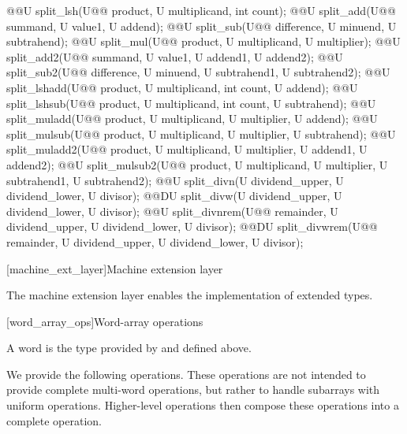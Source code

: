 \begin{addedblock}
\begin{itemdecl}
@@U split_lsh(U@\tcode{\remmodif{*}\addmodif{\&}}@ product, U multiplicand, int count);
@@U split_add(U@\tcode{\remmodif{*}\addmodif{\&}}@ summand, U value1, U addend);
@@U split_sub(U@\tcode{\remmodif{*}\addmodif{\&}}@ difference, U minuend, U subtrahend);
@@U split_mul(U@\tcode{\remmodif{*}\addmodif{\&}}@ product, U multiplicand, U multiplier);
@@U split_add2(U@\tcode{\remmodif{*}\addmodif{\&}}@ summand, U value1, U addend1, U addend2);
@@U split_sub2(U@\tcode{\remmodif{*}\addmodif{\&}}@ difference, U minuend, U subtrahend1, U subtrahend2);
@@U split_lshadd(U@\tcode{\remmodif{*}\addmodif{\&}}@ product, U multiplicand, int count, U addend);
@@U split_lshsub(U@\tcode{\remmodif{*}\addmodif{\&}}@ product, U multiplicand, int count, U subtrahend);
@@U split_muladd(U@\tcode{\remmodif{*}\addmodif{\&}}@ product, U multiplicand, U multiplier, U addend);
@@U split_mulsub(U@\tcode{\remmodif{*}\addmodif{\&}}@ product, U multiplicand, U multiplier, U subtrahend);
@@U split_muladd2(U@\tcode{\remmodif{*}\addmodif{\&}}@ product, U multiplicand, U multiplier, U addend1, U addend2);
@@U split_mulsub2(U@\tcode{\remmodif{*}\addmodif{\&}}@ product, U multiplicand, U multiplier, U subtrahend1, U subtrahend2);
@@U split_divn(U dividend_upper, U dividend_lower, U divisor);
@@DU split_divw(U dividend_upper, U dividend_lower, U divisor);
@@U split_divnrem(U@\tcode{\remmodif{*}\addmodif{\&}}@ remainder, U dividend_upper, U dividend_lower, U divisor);
@@DU split_divwrem(U@\tcode{\remmodif{*}\addmodif{\&}}@ remainder, U dividend_upper, U dividend_lower, U divisor);
\end{itemdecl}

[machine_ext_layer]{Machine extension layer}

The machine extension layer enables the implementation of extended types.

[word_array_ops]{Word-array operations}

A word is the type provided by  and defined above.

We provide the following operations. These operations are not intended to provide complete multi-word operations, but rather to handle subarrays with uniform operations. Higher-level operations then compose these operations into a complete operation.


\end{addedblock}
